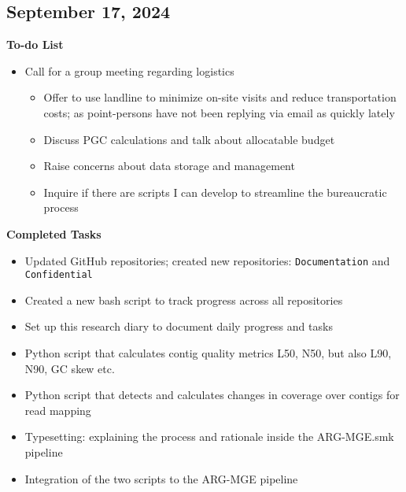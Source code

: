\documentclass[11pt]{report}
\newcommand{\done}{\checkmark}
\newcommand{\moved}{\faArrowCircleRight}
\begin{document}
{\newpage
\onecolumn


\onecolumn
\newpage



\begin{multicols}{2}
\section{September 17, 2024}

\textbf{To-do List}
\begin{itemize}
	\item [\moved] Call for a group meeting regarding logistics
	
	\begin{itemize}
		\item [\moved] Offer to use landline to minimize on-site visits and reduce transportation costs; as point-persons have not been replying via email as quickly lately
		\item [\moved] Discuss PGC calculations and talk about allocatable budget
		\item [\moved] Raise concerns about data storage and management
		\item [\moved] Inquire if there are scripts I can develop to streamline the bureaucratic process
	\end{itemize}
\end{itemize}

\textbf{Completed Tasks}
\begin{itemize}
	\item [\done] Updated GitHub repositories; created new repositories: \texttt{Documentation} and \texttt{Confidential}
	\item [\done] Created a new bash script to track progress across all repositories
	\item [\done] Set up this research diary to document daily progress and tasks
	\item [\done] Python script that calculates contig quality metrics L50, N50, but also L90, N90, GC skew etc.
	\item [\done] Python script that detects and calculates changes in coverage over contigs for read mapping
	\item [\done] Typesetting: explaining the process and rationale inside the ARG-MGE.smk pipeline
	\item [\done] Integration of the two scripts to the ARG-MGE pipeline
	
\end{itemize}


\end{multicols}}
\end{document}
